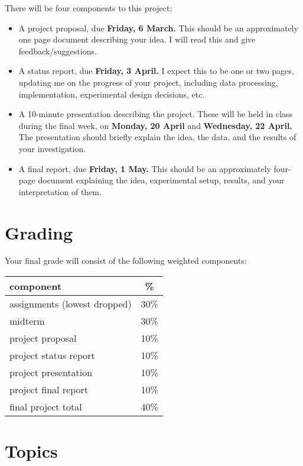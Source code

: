 \documentclass{article}
\begin{document}
There will be four components to this project:
\begin{itemize}
\item A project proposal, due \textbf{Friday, 6 March.}  This should
  be an approximately one page document describing your idea.  I will
  read this and give feedback/suggestions.
\item A status report, due \textbf{Friday, 3 April.}  I expect this to
  be one or two pages, updating me on the progress of your project,
  including data processing, implementation, experimental design
  decisions, etc.
\item A 10-minute presentation describing the project.  These will be
  held in class during the final week, on \textbf{Monday, 20 April}
  and \textbf{Wednesday, 22 April.}  The presentation should briefly
  explain the idea, the data, and the results of your investigation.
\item A final report, due \textbf{Friday, 1 May.}  This should be an
  approximately four-page document explaining the idea, experimental
  setup, results, and your interpretation of them.
\end{itemize}

\section*{Grading}

Your final grade will consist of the following weighted components:
\begin{center}
  \begin{tabular}{lc}
    \toprule
    component                    &   \% \\
    \midrule
    assignments (lowest dropped) & 30\% \\
    midterm                      & 30\% \\
    project proposal             & 10\% \\
    project status report        & 10\% \\
    project presentation         & 10\% \\
    project final report         & 10\% \\
    \midrule
    final project total          & 40\% \\
    \bottomrule
  \end{tabular}
\end{center}

\section*{Topics}
\end{document}
